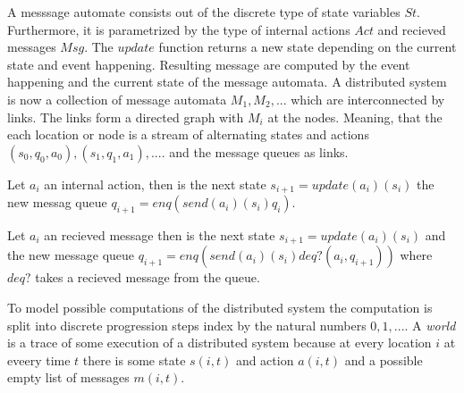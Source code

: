 A messsage automate consists out of the discrete type of state variables
$St$. Furthermore, it is parametrized by the type of internal actions $Act$ 
and recieved messages $Msg$. The $update$ function returns a new state
depending on the current state and event happening. Resulting message are
computed by the event happening and the current state of the message automata.
A distributed system is now a collection of message automata $M_1,M_2,...$ which
are interconnected by links. The links form a directed graph with $M_i$ at the
nodes. Meaning, that the each location or node is a stream of alternating states
and actions $(s_0,q_0,a_0),(s_1,q_1,a_1),....$ and the message queues as links.~\cite{bickford2003logic}

\begin{defi}
  Let $a_i$ an internal action, then is the next state
  $s_{i+1}=update(a_i)(s_i)$ the new messag queue $q_{i+1}=enq(send(a_i)(s_i)q_i)$.
\end{defi}

\begin{defi}
  Let $a_i$ an recieved message then is the next state
  $s_{i+1}=update(a_i)(s_i)$ and the new message queue
  $q_{i+1}=enq(send(a_i)(s_i)deq?(a_i,q_{i+1}))$ where $deq?$ takes
  a recieved message from the queue. 
\end{defi}

To model possible computations of the distributed system the computation
is split into discrete progression steps index by the natural numbers $0,1,...$.
A \textit{world} is a trace of some execution of a distributed system because
at every location $i$ at eveery time $t$ there is some state $s(i,t)$ and action
$a(i,t)$ and a possible empty list of messages $m(i,t)$.


